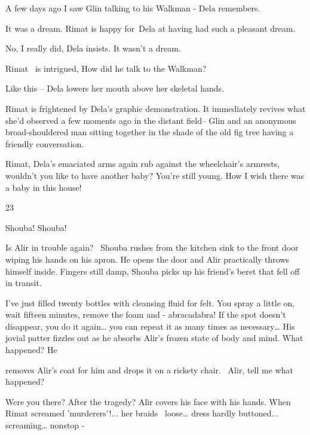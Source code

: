 \documentclass[12pt]{book}
\begin{document}
{\textquotedbl}A few days ago I saw Glin talking to his Walkman -{\textquotedbl} Dela remembers.

{\textquotedbl}It was a dream.{\textquotedbl} Rimat is happy for~Dela at having had such a pleasant dream.

{\textquotedbl}No, I really did,{\textquotedbl} Dela insists. {\textquotedbl}It wasn't a dream.{\textquotedbl}

Rimat ~is intrigued, {\textquotedbl}How did he talk to the Walkman?{\textquotedbl}

{\textquotedbl}Like this --{\textquotedbl} Dela lowers her mouth above her skeletal hands.

Rimat is frightened by Dela's graphic demonstration. It immediately revives what she'd observed a few moments ago in the
distant field-- Glin and an anonymous broad-shouldered man sitting together in the shade of the old fig tree having a
friendly conversation.

{\textquotedbl}Rimat,{\textquotedbl} Dela's emaciated arms again rub against the wheelchair's armrests,
{\textquotedbl}wouldn't you like to have another baby? You're still young. How I wish there was a baby in this
house!{\textquotedbl}


\bigskip

23~

{\textquotedbl}Shouba! Shouba!{\textquotedbl}

Is Alir in trouble again?~ Shouba rushes from the kitchen sink to the front door wiping his hands on his apron. He opens
the door and Alir practically throws himself inside. Fingers still damp, Shouba picks up his friend's beret that fell
off in transit.

{\textquotedbl}I've just filled twenty bottles with cleansing fluid for felt. You spray a little on, wait fifteen
minutes, remove the foam and - abracadabra! If the spot doesn't disappear, you do it again{\dots} you can repeat it as
many times as necessary{\dots}{\textquotedbl} His jovial patter fizzles out as he absorbs Alir's frozen state of body
and mind. {\textquotedbl}What happened?{\textquotedbl} He

removes Alir's coat for him and drops it on a rickety chair. \ {\textquotedbl}Alir, tell me what
happened?{\textquotedbl}

{\textquotedbl}Were you there? After the tragedy?{\textquotedbl} Alir covers his face with his hands.
{\textquotedbl}When Rimat screamed 'murderers'!... her braids \ loose{\dots} dress hardly buttoned... screaming{\dots}
nonstop -{\textquotedbl}
\end{document}
